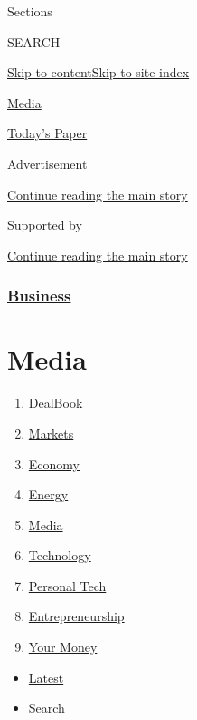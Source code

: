Sections

SEARCH

\protect\hyperlink{site-content}{Skip to
content}\protect\hyperlink{site-index}{Skip to site index}

\href{https://www.nytimes3xbfgragh.onion/pages/business/media/index.html}{Media}

\href{https://myaccount.nytimes3xbfgragh.onion/auth/login?response_type=cookie\&client_id=vi}{}

\href{https://www.nytimes3xbfgragh.onion/section/todayspaper}{Today's
Paper}

Advertisement

\protect\hyperlink{after-top}{Continue reading the main story}

Supported by

\protect\hyperlink{after-sponsor}{Continue reading the main story}

\hypertarget{business}{%
\subsubsection{\texorpdfstring{\href{/section/business}{Business}}{Business}}\label{business}}

\hypertarget{media}{%
\section{Media}\label{media}}

\begin{enumerate}
\def\labelenumi{\arabic{enumi}.}
\tightlist
\item
  \href{/pages/business/dealbook/index.html}{DealBook}
\item
  \href{https://markets.on.nytimes3xbfgragh.onion}{Markets}
\item
  \href{/section/business/economy}{Economy}
\item
  \href{/section/business/energy-environment}{Energy}
\item
  \href{/section/business/media}{Media}
\item
  \href{/section/technology}{Technology}
\item
  \href{/section/technology/personaltech}{Personal Tech}
\item
  \href{/section/business/smallbusiness}{Entrepreneurship}
\item
  \href{/section/your-money}{Your Money}
\end{enumerate}

\begin{itemize}
\tightlist
\item
  \protect\hyperlink{stream-panel}{Latest}
\item
  Search
\end{itemize}

